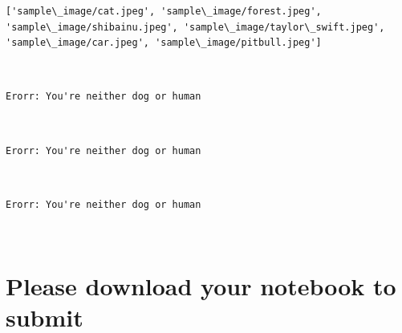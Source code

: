 \documentclass[11pt]{article}
\begin{document}
    \begin{Verbatim}[commandchars=\\\{\}]
['sample\_image/cat.jpeg', 'sample\_image/forest.jpeg', 'sample\_image/shibainu.jpeg', 'sample\_image/taylor\_swift.jpeg', 'sample\_image/car.jpeg', 'sample\_image/pitbull.jpeg']

    \end{Verbatim}

    \begin{center}
    \end{center}
    { \hspace*{\fill} \\}
    
    \begin{Verbatim}[commandchars=\\\{\}]
Erorr: You're neither dog or human

    \end{Verbatim}

    \begin{center}
    \end{center}
    { \hspace*{\fill} \\}
    
    \begin{Verbatim}[commandchars=\\\{\}]
Erorr: You're neither dog or human

    \end{Verbatim}

    \begin{center}
    \end{center}
    { \hspace*{\fill} \\}
    
    \begin{Verbatim}[commandchars=\\\{\}]
Erorr: You're neither dog or human

    \end{Verbatim}

    \begin{center}
    \end{center}
    { \hspace*{\fill} \\}
    
    \section{Please download your notebook to
submit}\label{please-download-your-notebook-to-submit}


    
    
    
    
\end{document}

